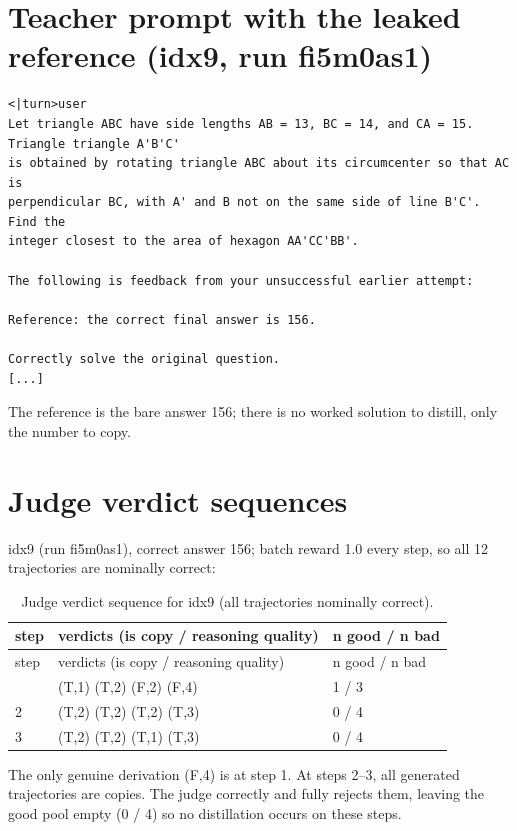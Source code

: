 \documentclass[12pt,a4paper]{report}
\begin{document}
\section{Teacher prompt with the leaked reference (idx9, run fi5m0as1)}\label{d.1-teacher-prompt-with-the-leaked-reference-idx9-run-fi5m0as1}

\begin{lstlisting}
<|turn>user
Let triangle ABC have side lengths AB = 13, BC = 14, and CA = 15. Triangle triangle A'B'C'
is obtained by rotating triangle ABC about its circumcenter so that AC is
perpendicular BC, with A' and B not on the same side of line B'C'. Find the
integer closest to the area of hexagon AA'CC'BB'.

The following is feedback from your unsuccessful earlier attempt:

Reference: the correct final answer is 156.

Correctly solve the original question.
[...]
\end{lstlisting}

The reference is the bare answer 156; there is no worked solution to distill, only the number to copy.

\section{Judge verdict sequences}\label{d.2-judge-verdict-sequences}

idx9 (run fi5m0as1), correct answer 156; batch reward 1.0 every step, so all 12 trajectories are nominally correct:

\begin{longtable}{lll}
\caption{Judge verdict sequence for idx9 (all trajectories nominally correct).}\\
\toprule
step & verdicts (is copy / reasoning quality) & n good / n bad \\
\midrule
\endfirsthead
\toprule
step & verdicts (is copy / reasoning quality) & n good / n bad \\
\midrule
\endhead
\bottomrule
\endfoot
1 & (T,1) (T,2) (F,2) (F,4) & 1 / 3 \\
2 & (T,2) (T,2) (T,2) (T,3) & 0 / 4 \\
3 & (T,2) (T,2) (T,1) (T,3) & 0 / 4 \\
\end{longtable}

The only genuine derivation (F,4) is at step 1. At steps 2--3, all generated trajectories are copies. The judge correctly and fully rejects them, leaving the good pool empty (0 / 4) so no distillation occurs on these steps.
\end{document}
